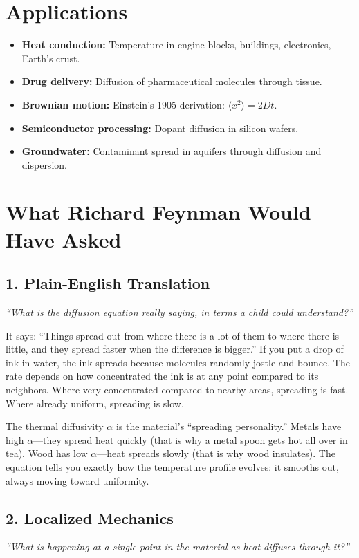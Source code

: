 \section*{Applications}

\begin{itemize}
\item \textbf{Heat conduction:} Temperature in engine blocks, buildings, electronics, Earth's crust.
\item \textbf{Drug delivery:} Diffusion of pharmaceutical molecules through tissue.
\item \textbf{Brownian motion:} Einstein's 1905 derivation: $\langle x^2 \rangle = 2Dt$.
\item \textbf{Semiconductor processing:} Dopant diffusion in silicon wafers.
\item \textbf{Groundwater:} Contaminant spread in aquifers through diffusion and dispersion.
\end{itemize}
\section*{What Richard Feynman Would Have Asked}

\subsection*{1. Plain-English Translation}
\textit{``What is the diffusion equation really saying, in terms a child could understand?''}

It says: ``Things spread out from where there is a lot of them to where there is little, and they spread faster when the difference is bigger.'' If you put a drop of ink in water, the ink spreads because molecules randomly jostle and bounce. The rate depends on how concentrated the ink is at any point compared to its neighbors. Where very concentrated compared to nearby areas, spreading is fast. Where already uniform, spreading is slow.

The thermal diffusivity $\alpha$ is the material's ``spreading personality.'' Metals have high $\alpha$---they spread heat quickly (that is why a metal spoon gets hot all over in tea). Wood has low $\alpha$---heat spreads slowly (that is why wood insulates). The equation tells you exactly how the temperature profile evolves: it smooths out, always moving toward uniformity.

\subsection*{2. Localized Mechanics}
\textit{``What is happening at a single point in the material as heat diffuses through it?''}

